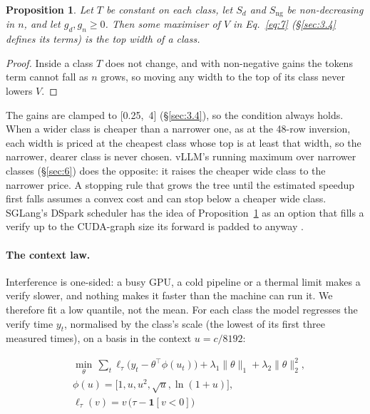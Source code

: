 \documentclass[10pt,twocolumn,letterpaper]{article}
\newtheorem{proposition}{Proposition}
\begin{document}
\begin{proposition}\label{prop:2}
Let $T$ be constant on each class, let $S_d$ and $S_{\mathrm{ng}}$ be non-decreasing in $n$, and let $g_d, g_n \geq 0$. Then some maximiser of $V$ in Eq.~\eqref{eq:7} (\S\ref{sec:3.4} defines its terms) is the top width of a class.
\end{proposition}

\begin{proof}
Inside a class $T$ does not change, and with non-negative gains the tokens term cannot fall as $n$ grows, so moving any width to the top of its class never lowers $V$.
\end{proof}

The gains are clamped to [0.25,~4] (\S\ref{sec:3.4}), so the condition always holds. When a wider class is cheaper than a narrower one, as at the 48-row inversion, each width is priced at the cheapest class whose top is at least that width, so the narrower, dearer class is never chosen. vLLM's running maximum over narrower classes (\S\ref{sec:6}) does the opposite: it raises the cheaper wide class to the narrower price. A stopping rule that grows the tree until the estimated speedup first falls \cite{oh2026bastion} assumes a convex cost and can stop below a cheaper wide class. SGLang's DSpark scheduler has the idea of Proposition~\ref{prop:2} as an option that fills a verify up to the CUDA-graph size its forward is padded to anyway \cite{zheng2024sglang}.

\paragraph{The context law.} Interference is one-sided: a busy GPU, a cold pipeline or a thermal limit makes a verify slower, and nothing makes it faster than the machine can run it. We therefore fit a low quantile, not the mean. For each class the model regresses the verify time $y_{t}$, normalised by the class's scale (the lowest of its first three measured times), on a basis in the context $u = c/8192$:

\begin{equation}\label{eq:4}
\begin{split}
&\min_{\theta}\, \sum_t \ell_\tau\bigl(y_t - \theta^{\top}\phi(u_t)\bigr) + \lambda_1\|\theta\|_1 + \lambda_2\|\theta\|_2^2,\\
&\phi(u) = \bigl[1, u, u^2, \sqrt{u}, \ln(1+u)\bigr],\\
&\ell_\tau(v) = v\,\bigl(\tau - \mathbf{1}[v<0]\bigr)
\end{split}
\end{equation}
\end{document}
